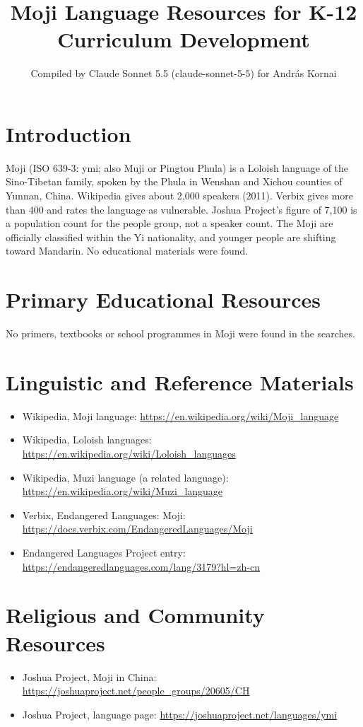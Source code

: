 \documentclass[12pt]{article}
\title{Moji Language Resources for K-12 Curriculum Development}
\author{Compiled by Claude Sonnet 5.5 (claude-sonnet-5-5) for Andr\'as Kornai}
\date{}
\begin{document}
\maketitle

\section{Introduction}
Moji (ISO 639-3: ymi; also Muji or Pingtou Phula) is a Loloish language of the Sino-Tibetan family, spoken by the Phula in Wenshan and Xichou counties of Yunnan, China. Wikipedia gives about 2,000 speakers (2011). Verbix gives more than 400 and rates the language as vulnerable. Joshua Project's figure of 7,100 is a population count for the people group, not a speaker count. The Moji are officially classified within the Yi nationality, and younger people are shifting toward Mandarin. No educational materials were found.

\section{Primary Educational Resources}
No primers, textbooks or school programmes in Moji were found in the searches.

\section{Linguistic and Reference Materials}
\begin{itemize}
\item Wikipedia, Moji language: \url{https://en.wikipedia.org/wiki/Moji_language}
\item Wikipedia, Loloish languages: \url{https://en.wikipedia.org/wiki/Loloish_languages}
\item Wikipedia, Muzi language (a related language): \url{https://en.wikipedia.org/wiki/Muzi_language}
\item Verbix, Endangered Languages: Moji: \url{https://docs.verbix.com/EndangeredLanguages/Moji}
\item Endangered Languages Project entry: \url{https://endangeredlanguages.com/lang/3179?hl=zh-cn}
\end{itemize}

\section{Religious and Community Resources}
\begin{itemize}
\item Joshua Project, Moji in China: \url{https://joshuaproject.net/people_groups/20605/CH}
\item Joshua Project, language page: \url{https://joshuaproject.net/languages/ymi}
\end{itemize}
\end{document}
